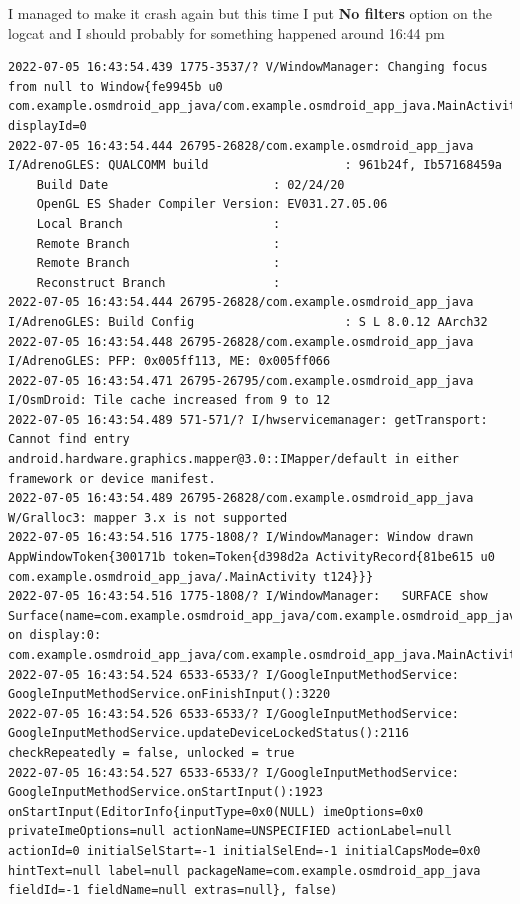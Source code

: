\documentclass[a4paper,12pt]{book}
\begin{document}
I managed to make it crash again but this time I put \textbf{No filters} option on the logcat and I should probably for something happened around 16:44 pm

\begin{lstlisting}
2022-07-05 16:43:54.439 1775-3537/? V/WindowManager: Changing focus from null to Window{fe9945b u0 com.example.osmdroid_app_java/com.example.osmdroid_app_java.MainActivity} displayId=0
2022-07-05 16:43:54.444 26795-26828/com.example.osmdroid_app_java I/AdrenoGLES: QUALCOMM build                   : 961b24f, Ib57168459a
    Build Date                       : 02/24/20
    OpenGL ES Shader Compiler Version: EV031.27.05.06
    Local Branch                     : 
    Remote Branch                    : 
    Remote Branch                    : 
    Reconstruct Branch               : 
2022-07-05 16:43:54.444 26795-26828/com.example.osmdroid_app_java I/AdrenoGLES: Build Config                     : S L 8.0.12 AArch32
2022-07-05 16:43:54.448 26795-26828/com.example.osmdroid_app_java I/AdrenoGLES: PFP: 0x005ff113, ME: 0x005ff066
2022-07-05 16:43:54.471 26795-26795/com.example.osmdroid_app_java I/OsmDroid: Tile cache increased from 9 to 12
2022-07-05 16:43:54.489 571-571/? I/hwservicemanager: getTransport: Cannot find entry android.hardware.graphics.mapper@3.0::IMapper/default in either framework or device manifest.
2022-07-05 16:43:54.489 26795-26828/com.example.osmdroid_app_java W/Gralloc3: mapper 3.x is not supported
2022-07-05 16:43:54.516 1775-1808/? I/WindowManager: Window drawn AppWindowToken{300171b token=Token{d398d2a ActivityRecord{81be615 u0 com.example.osmdroid_app_java/.MainActivity t124}}}
2022-07-05 16:43:54.516 1775-1808/? I/WindowManager:   SURFACE show Surface(name=com.example.osmdroid_app_java/com.example.osmdroid_app_java.MainActivity)/@0x9a31b37 on display:0: com.example.osmdroid_app_java/com.example.osmdroid_app_java.MainActivity
2022-07-05 16:43:54.524 6533-6533/? I/GoogleInputMethodService: GoogleInputMethodService.onFinishInput():3220 
2022-07-05 16:43:54.526 6533-6533/? I/GoogleInputMethodService: GoogleInputMethodService.updateDeviceLockedStatus():2116 checkRepeatedly = false, unlocked = true
2022-07-05 16:43:54.527 6533-6533/? I/GoogleInputMethodService: GoogleInputMethodService.onStartInput():1923 onStartInput(EditorInfo{inputType=0x0(NULL) imeOptions=0x0 privateImeOptions=null actionName=UNSPECIFIED actionLabel=null actionId=0 initialSelStart=-1 initialSelEnd=-1 initialCapsMode=0x0 hintText=null label=null packageName=com.example.osmdroid_app_java fieldId=-1 fieldName=null extras=null}, false)

\end{lstlisting}
\end{document}
